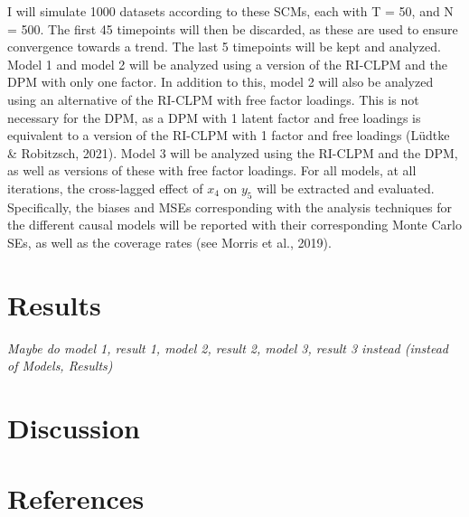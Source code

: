 \documentclass[
]{interact}
\begin{document}
I will simulate 1000 datasets according to these SCMs, each with T = 50,
and N = 500. The first 45 timepoints will then be discarded, as these
are used to ensure convergence towards a trend. The last 5 timepoints
will be kept and analyzed. Model 1 and model 2 will be analyzed using a
version of the RI-CLPM and the DPM with only one factor. In addition to
this, model 2 will also be analyzed using an alternative of the RI-CLPM
with free factor loadings. This is not necessary for the DPM, as a DPM
with 1 latent factor and free loadings is equivalent to a version of the
RI-CLPM with 1 factor and free loadings (Lüdtke \& Robitzsch, 2021).
Model 3 will be analyzed using the RI-CLPM and the DPM, as well as
versions of these with free factor loadings. For all models, at all
iterations, the cross-lagged effect of \(x_4\) on \(y_5\) will be
extracted and evaluated. Specifically, the biases and MSEs corresponding
with the analysis techniques for the different causal models will be
reported with their corresponding Monte Carlo SEs, as well as the
coverage rates (see Morris et al., 2019).

\hypertarget{results}{%
\section{Results}\label{results}}

\emph{Maybe do model 1, result 1, model 2, result 2, model 3, result 3
instead (instead of Models, Results)}

\hypertarget{discussion}{%
\section{Discussion}\label{discussion}}

\newpage{}

\hypertarget{references}{%
\section*{References}\label{references}}
\end{document}

